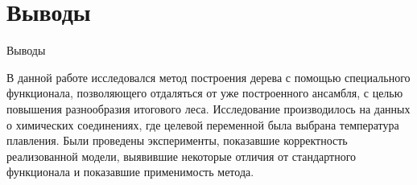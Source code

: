 \documentclass[10pt,pdf,hyperref={unicode}]{beamer}
\begin{document}
	\section{Выводы}
	\begin{frame}{Выводы}
	
	В данной работе исследовался метод построения дерева с помощью специального функционала, позволяющего отдаляться от уже построенного ансамбля, с целью повышения разнообразия итогового леса. Исследование производилось на данных о химических соединениях, где целевой переменной была выбрана температура плавления.
Были проведены эксперименты, показавшие корректность реализованной модели, выявившие некоторые отличия от стандартного функционала и показавшие применимость метода.

	\end{frame}
	

	
\end{document}
